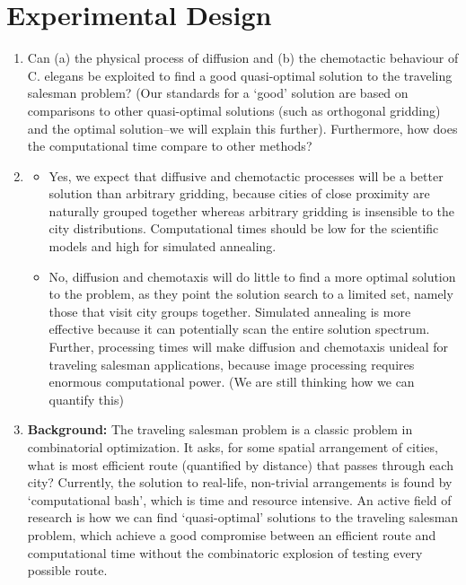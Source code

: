 \section{Experimental Design}

\begin{enumerate}
\item Can (a) the physical process of diffusion and (b) the chemotactic behaviour of C. elegans be exploited to find a good quasi-optimal solution to the traveling salesman problem? (Our standards for a `good' solution are based on comparisons to other quasi-optimal solutions (such as orthogonal gridding) and the optimal solution--we will explain this further). Furthermore, how does the computational time compare to other methods?

\item
\begin{itemize}

\item Yes, we expect that diffusive and chemotactic processes will be a better solution than arbitrary gridding, because cities of close proximity are naturally grouped together whereas arbitrary gridding is insensible to the city distributions. Computational times should be low for the scientific models and high for simulated annealing. 

\item No, diffusion and chemotaxis will do little to find a more optimal solution to the problem, as they point the solution search to a limited set, namely those that visit city groups together. Simulated annealing is more effective because it can potentially scan the entire solution spectrum. Further, processing times will make diffusion and chemotaxis unideal for traveling salesman applications, because image processing requires enormous computational power. (We are still thinking how we can quantify this)

\end{itemize}

\item \textbf{Background:} The traveling salesman problem is a classic problem in combinatorial optimization. It asks, for some spatial arrangement of cities, what is most efficient route (quantified by distance) that passes through each city? Currently, the solution to real-life, non-trivial arrangements is found by `computational bash', which is time and resource intensive. An active field of research is how we can find `quasi-optimal' solutions to the traveling salesman problem, which achieve a good compromise between an efficient route and computational time without the combinatoric explosion of testing every possible route.


\end{enumerate}
